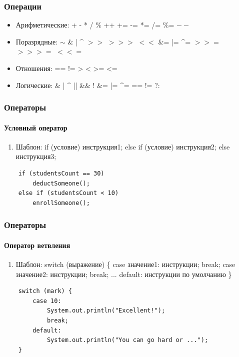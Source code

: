\documentclass[10pt,pdf,hyperref={unicode}]{beamer}
\begin{document}
\begin{frame}[fragile]
\frametitle{Операции}
\begin{itemize}
  \item<1-> Арифметические: + - * / \% ++ += -= *= /= \%= $--$
  \item<2-> Поразрядные: $\sim$ \& | \^{} $>>$ $>>>$ $<<$ \&= |= \^{}= $>>=$ $>>>=$ $<<=$
  \item<3-> Отношения: == != > < >= <=
  \item<4-> Логические: \& | \^{} || \&\& ! \&= |= \^{}= == != ?:
\end{itemize}
\end{frame}

\begin{frame}[fragile]
\frametitle{Операторы}
\framesubtitle{Условный оператор}
\begin{enumerate}
  \item Шаблон:
    \newline if (условие) инструкция1;
    \newline else if (условие) инструкция2;
    \newline else инструкция3;
\end{enumerate}
\begin{lstlisting}
    if (studentsCount == 30)
        deductSomeone();
    else if (studentsCount < 10)
        enrollSomeone();
\end{lstlisting}
\end{frame}

\begin{frame}[fragile]
\frametitle{Операторы}
\framesubtitle{Оператор ветвления}
\begin{enumerate}
  \item Шаблон:
    \newline switch (выражение) \{
    \newline     case значение1: инструкции; break;
    \newline     case значение2: инструкции; break;
    \newline     ...
    \newline     default: инструкции по умолчанию
    \newline \}
\end{enumerate}
\begin{lstlisting}
    switch (mark) {
        case 10:
            System.out.println("Excellent!");
            break;
        default:
            System.out.println("You can go hard or ...");
    }
\end{lstlisting}
\end{frame}
\end{document}
